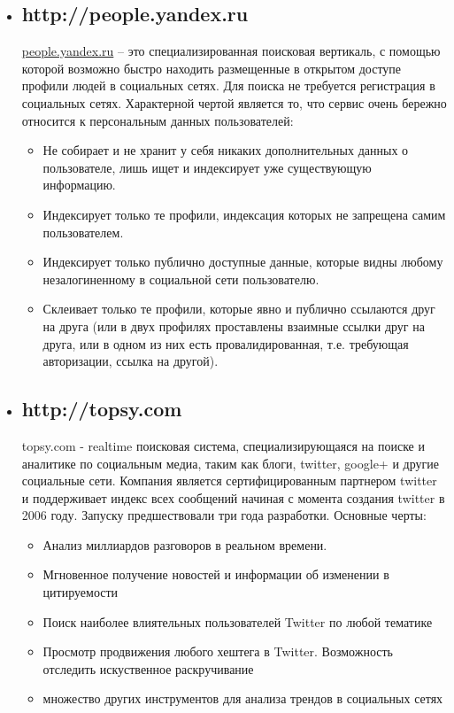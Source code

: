 \begin{chap1}
\begin{itemize}
\item \subsection{http://people.yandex.ru} %
\url{people.yandex.ru} – это специализированная поисковая вертикаль, с помощью которой возможно быстро находить размещенные в открытом доступе профили людей в социальных сетях. Для поиска не требуется регистрация в социальных сетях. Характерной чертой является то, что сервис очень бережно относится к персональным данных пользователей:
\begin{itemize}
\item Не собирает и не хранит у себя никаких дополнительных данных о пользователе, лишь ищет и индексирует уже существующую информацию.
\item Индексирует только те профили, индексация которых не запрещена самим пользователем.
\item Индексирует только публично доступные данные, которые видны любому незалогиненному в социальной сети пользователю.
\item Склеивает только те профили, которые явно и публично ссылаются друг на друга (или в двух профилях проставлены взаимные ссылки друг на друга, или в одном из них есть провалидированная, т.е. требующая авторизации, ссылка на другой).
\end{itemize}

\item \subsection{http://topsy.com}
topsy.com - realtime поисковая система, специализирующаяся на поиске и аналитике по социальным медиа, таким как блоги, twitter, google+ и другие социальные сети. Компания является сертифицированным партнером twitter и поддерживает индекс всех сообщений начиная с момента создания twitter в 2006 году. Запуску предшествовали три года разработки. Основные черты:
\begin{itemize}
\item Анализ миллиардов разговоров в реальном времени.
\item Мгновенное получение новостей и информации об изменении в цитируемости
\item Поиск наиболее влиятельных пользователей Twitter по любой тематике
\item Просмотр продвижения любого хештега в Twitter. Возможность отследить искуственное раскручивание
\item множество других инструментов для анализа трендов в социальных сетях
\end{itemize}


\end{itemize}
\end{chap1}
